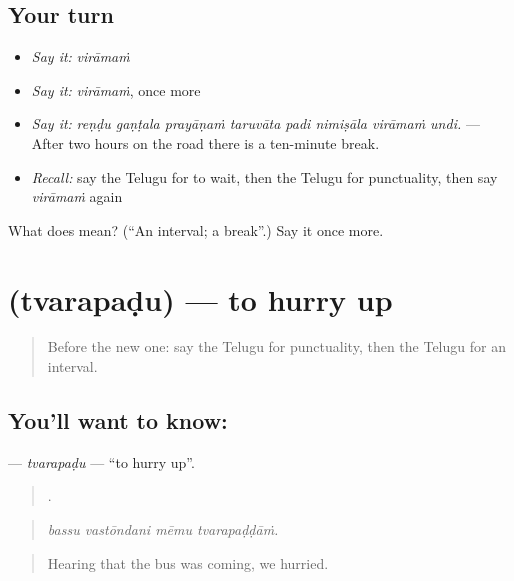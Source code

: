\subsection*{Your turn}
\begin{itemize}
\raggedright
  \item \emph{Say it:} \emph{virāmaṁ}
  \item \emph{Say it:} \emph{virāmaṁ}, once more
  \item \emph{Say it:} \emph{reṇḍu gaṇṭala prayāṇaṁ taruvāta padi nimiṣāla virāmaṁ undi.} — After two hours on the road there is a ten-minute break.
  \item \emph{Recall:} say the Telugu for to wait, then the Telugu for punctuality, then say \emph{virāmaṁ} again
\end{itemize}

\begin{tcolorbox}[breakable,colback=teal!4,colframe=teal!35!black,title={Before you move on}]
What does  mean? (\textquotedblleft{}An interval; a break\textquotedblright{}.) Say it once more.
\end{tcolorbox}
\section[\texorpdfstring{\te{త్వరపడు} (tvarapaḍu)}{త్వరపడు (tvarapaḍu)}]{ (tvarapaḍu) — to hurry up}

\label{lesson:TE-C440-tvarapadu}



\begin{quote}
Before the new one: say the Telugu for punctuality, then the Telugu for an interval.
\end{quote}

\subsection*{You'll want to know: }
\textbf{} — \emph{tvarapaḍu} — \textquotedblleft{}to hurry up\textquotedblright{}.

\begin{quote}
   .
\end{quote}

\begin{quote}
\emph{bassu vastōndani mēmu tvarapaḍḍāṁ.}
\end{quote}

\begin{quote}
Hearing that the bus was coming, we hurried.
\end{quote}

